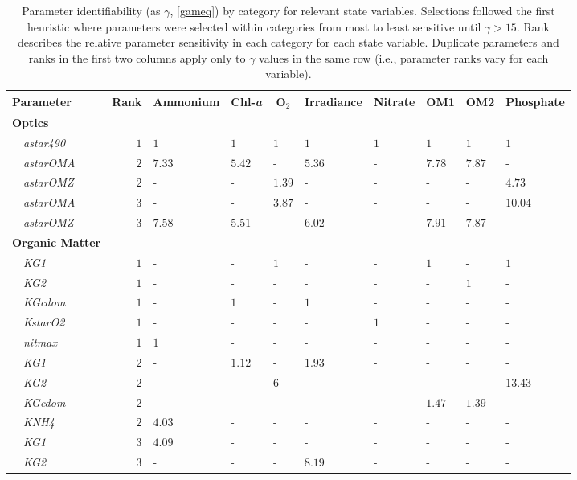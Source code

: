 \documentclass[letterpaper,12pt,oneside]{article}\usepackage[]{graphicx}\usepackage[]{color}
\begin{document}
\begin{table}[!tbp]
{\scriptsize
\caption{Parameter identifiability (as $\gamma$, \cref{gameq}) by category for relevant state variables.  Selections followed the first heuristic where parameters were selected within categories from most to least sensitive until $\gamma > 15$.  Rank describes the relative parameter sensitivity in each category for each state variable. Duplicate parameters and ranks in the first two columns apply only to $\gamma$ values in the same row (i.e., parameter ranks vary for each variable).\label{tab:heurist1}} 
\begin{center}
\begin{tabular}{lrllllllll}
\hline\hline
\multicolumn{1}{l}{Parameter}&\multicolumn{1}{c}{Rank}&\multicolumn{1}{c}{Ammonium}&\multicolumn{1}{c}{Chl-\textit{a}}&\multicolumn{1}{c}{O$_2$}&\multicolumn{1}{c}{Irradiance}&\multicolumn{1}{c}{Nitrate}&\multicolumn{1}{c}{OM1}&\multicolumn{1}{c}{OM2}&\multicolumn{1}{c}{Phosphate}\tabularnewline
\hline
{\bfseries Optics}&&&&&&&&&\tabularnewline
~~\scriptsize{\textit{astar490}}&$1$&$1$&$1$&$1$&$1$&$1$&$1$&$1$&$1$\tabularnewline
~~\scriptsize{\textit{astarOMA}}&$2$&$7.33$&$5.42$&-&$5.36$&-&$7.78$&$7.87$&-\tabularnewline
~~\scriptsize{\textit{astarOMZ}}&$2$&-&-&$1.39$&-&-&-&-&$4.73$\tabularnewline
~~\scriptsize{\textit{astarOMA}}&$3$&-&-&$3.87$&-&-&-&-&$10.04$\tabularnewline
~~\scriptsize{\textit{astarOMZ}}&$3$&$7.58$&$5.51$&-&$6.02$&-&$7.91$&$7.87$&-\tabularnewline
\hline
{\bfseries Organic Matter}&&&&&&&&&\tabularnewline
~~\scriptsize{\textit{KG1}}&$1$&-&-&$1$&-&-&$1$&-&$1$\tabularnewline
~~\scriptsize{\textit{KG2}}&$1$&-&-&-&-&-&-&$1$&-\tabularnewline
~~\scriptsize{\textit{KGcdom}}&$1$&-&$1$&-&$1$&-&-&-&-\tabularnewline
~~\scriptsize{\textit{KstarO2}}&$1$&-&-&-&-&$1$&-&-&-\tabularnewline
~~\scriptsize{\textit{nitmax}}&$1$&$1$&-&-&-&-&-&-&-\tabularnewline
~~\scriptsize{\textit{KG1}}&$2$&-&$1.12$&-&$1.93$&-&-&-&-\tabularnewline
~~\scriptsize{\textit{KG2}}&$2$&-&-&$6$&-&-&-&-&$13.43$\tabularnewline
~~\scriptsize{\textit{KGcdom}}&$2$&-&-&-&-&-&$1.47$&$1.39$&-\tabularnewline
~~\scriptsize{\textit{KNH4}}&$2$&$4.03$&-&-&-&-&-&-&-\tabularnewline
~~\scriptsize{\textit{KG1}}&$3$&$4.09$&-&-&-&-&-&-&-\tabularnewline
~~\scriptsize{\textit{KG2}}&$3$&-&-&-&$8.19$&-&-&-&-\tabularnewline

\end{tabular}
\end{center}}
\end{table}
\end{document}
